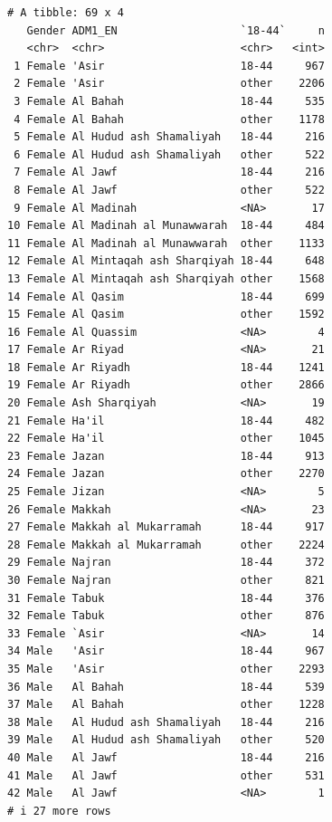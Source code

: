 \documentclass[
  letterpaper,
  DIV=11,
  numbers=noendperiod]{scrreprt}
\begin{document}
\begin{verbatim}
# A tibble: 69 x 4
   Gender ADM1_EN                   `18-44`     n
   <chr>  <chr>                     <chr>   <int>
 1 Female 'Asir                     18-44     967
 2 Female 'Asir                     other    2206
 3 Female Al Bahah                  18-44     535
 4 Female Al Bahah                  other    1178
 5 Female Al Hudud ash Shamaliyah   18-44     216
 6 Female Al Hudud ash Shamaliyah   other     522
 7 Female Al Jawf                   18-44     216
 8 Female Al Jawf                   other     522
 9 Female Al Madinah                <NA>       17
10 Female Al Madinah al Munawwarah  18-44     484
11 Female Al Madinah al Munawwarah  other    1133
12 Female Al Mintaqah ash Sharqiyah 18-44     648
13 Female Al Mintaqah ash Sharqiyah other    1568
14 Female Al Qasim                  18-44     699
15 Female Al Qasim                  other    1592
16 Female Al Quassim                <NA>        4
17 Female Ar Riyad                  <NA>       21
18 Female Ar Riyadh                 18-44    1241
19 Female Ar Riyadh                 other    2866
20 Female Ash Sharqiyah             <NA>       19
21 Female Ha'il                     18-44     482
22 Female Ha'il                     other    1045
23 Female Jazan                     18-44     913
24 Female Jazan                     other    2270
25 Female Jizan                     <NA>        5
26 Female Makkah                    <NA>       23
27 Female Makkah al Mukarramah      18-44     917
28 Female Makkah al Mukarramah      other    2224
29 Female Najran                    18-44     372
30 Female Najran                    other     821
31 Female Tabuk                     18-44     376
32 Female Tabuk                     other     876
33 Female `Asir                     <NA>       14
34 Male   'Asir                     18-44     967
35 Male   'Asir                     other    2293
36 Male   Al Bahah                  18-44     539
37 Male   Al Bahah                  other    1228
38 Male   Al Hudud ash Shamaliyah   18-44     216
39 Male   Al Hudud ash Shamaliyah   other     520
40 Male   Al Jawf                   18-44     216
41 Male   Al Jawf                   other     531
42 Male   Al Jawf                   <NA>        1
# i 27 more rows
\end{verbatim}
\end{document}
